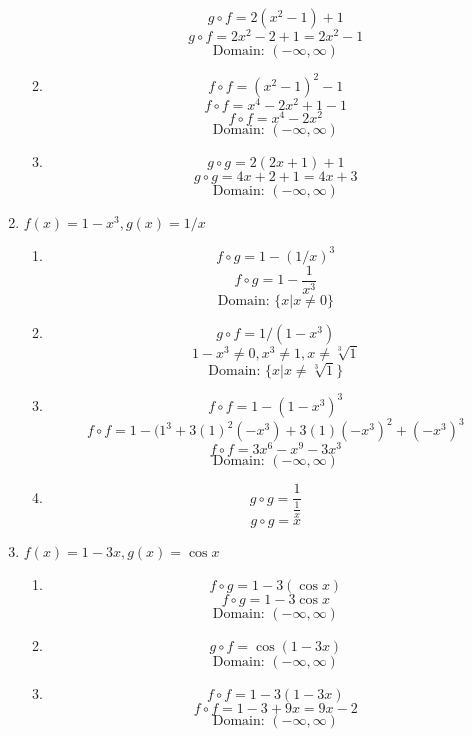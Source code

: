 \documentclass{article}
\begin{document}
\begin{enumerate}
\begin{enumerate}
			$$g \circ f = 2(x^2 - 1) + 1$$
			$$g \circ f = 2x^2 - 2 + 1 = 2x^2 - 1$$
			$$\text{Domain: } (-\infty, \infty)$$
			
			\item
			
			$$f \circ f = (x^2 - 1)^2 - 1$$
			$$f \circ f = x^4 - 2x^2 + 1 - 1$$
			$$f \circ f = x^4 - 2x^2$$
			$$\text{Domain: } (-\infty, \infty)$$
			
			\item
			
			$$g \circ g = 2(2x + 1) + 1$$
			$$g \circ g = 4x + 2 + 1 = 4x + 3$$
			$$\text{Domain: } (-\infty, \infty)$$
		\end{enumerate}
		
		\item $f(x) = 1 - x^3, g(x) = 1/x$
		
		\begin{enumerate}
		
			\item
			$$f \circ g = 1 - (1/x)^3$$
			$$f \circ g = 1 - \frac{1}{x^3}$$
			$$\text{Domain: } \{x | x \neq 0\}$$
			
			\item
			$$g \circ f = 1 / (1 - x^3)$$
			$$ 1 - x^3 \neq 0, x^3 \neq 1, x \neq \sqrt[3]{1}$$
			$$\text{Domain: } \{x | x \neq \sqrt[3]{1}\}$$

			\item 
			$$f \circ f = 1 - (1 - x^3)^3$$
			$$f \circ f = 1 - (1^3 + 3(1)^2(-x^3) + 3(1)(-x^3)^2 + (-x^3)^3$$
			$$f \circ f = 3x^6 - x^9 - 3x^3$$
			$$\text{Domain: } (-\infty, \infty)$$

			\item
			$$g \circ g = \frac{1}{\frac{1}{x}}$$
			$$ g \circ g = x$$
		\end{enumerate}

		\item $f(x) = 1 - 3x, g(x) = \cos x$

			\begin{enumerate}

				\item
				$$f \circ g = 1 - 3(\cos x)$$
				$$f \circ g = 1 - 3\cos x$$
				$$\text{Domain: } (-\infty, \infty)$$

				\item
				$$g \circ f = \cos(1 - 3x)$$
				$$\text{Domain: } (-\infty, \infty)$$

				\item 
				$$f \circ f = 1 - 3(1 - 3x)$$
				$$f \circ f = 1 - 3 + 9x = 9x -2$$
				$$\text{Domain: } (-\infty,\infty)$$


\end{enumerate}
\end{enumerate}
\end{document}
